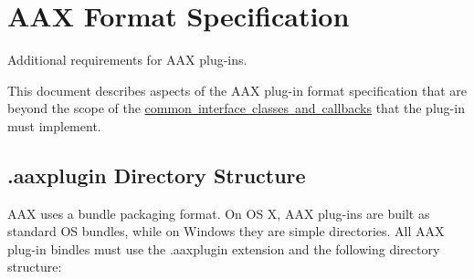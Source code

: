 \hypertarget{a00801}{}\section{A\+AX Format Specification}
\label{a00801}
Additional requirements for A\+AX plug-\/ins. 

This document describes aspects of the A\+AX plug-\/in format specification that are beyond the scope of the \mbox{\hyperlink{a00795}{common interface classes and callbacks}} that the plug-\/in must implement.

 \hypertarget{a00801_commoninterface_formatspecification__aaxplugin_directory_structure}{}\subsection{.\+aaxplugin Directory Structure}\label{a00801_commoninterface_formatspecification__aaxplugin_directory_structure}
A\+AX uses a bundle packaging format. On OS X, A\+AX plug-\/ins are built as standard OS bundles, while on Windows they are simple directories. All A\+AX plug-\/in bindles must use the .aaxplugin extension and the following directory structure\+:



